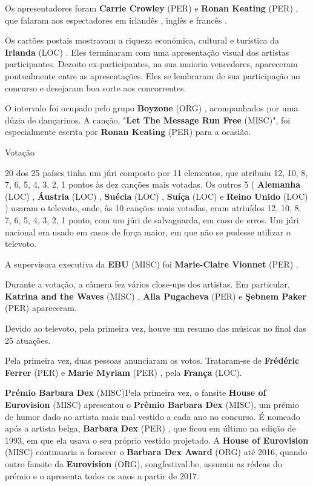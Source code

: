 \documentclass[12pt,a4paper]{article}
\begin{document}
Os apresentadores foram \textbf{Carrie Crowley} (PER) e \textbf{Ronan Keating} (PER) , que falaram aos espectadores em irlandês , inglês e francês .

Os cartões postais mostravam a riqueza económica, cultural e turística da \textbf{Irlanda} (LOC) . Eles terminaram com uma apresentação visual dos artistas participantes. Dezoito ex-participantes, na sua maioria vencedores, apareceram pontualmente entre as apresentações. Eles se lembraram de sua participação no concurso e desejaram boa sorte aos concorrentes.

O intervalo foi ocupado pelo grupo \textbf{Boyzone} (ORG) , acompanhados por uma dúzia de dançarinos. A canção, "\textbf{Let The Message Run Free} (MISC)", foi especialmente escrita por \textbf{Ronan Keating} (PER) para a ocasião.



Votação

20 dos 25 países tinha um júri composto por 11 elementos, que atribuiu 12, 10, 8, 7, 6, 5, 4, 3, 2, 1 pontos às dez canções mais votadas. Os outros 5 ( \textbf{Alemanha} (LOC) , \textbf{Áustria} (LOC) , \textbf{Suécia} (LOC) , \textbf{Suíça} (LOC) e \textbf{Reino Unido} (LOC) ) usaram o televoto, onde, às 10 canções mais votadas, eram atriuídos 12, 10, 8, 7, 6, 5, 4, 3, 2, 1 ponto, com um júri de salvaguarda, em caso de erros. Um júri nacional era usado em casos de força maior, em que não se pudesse utilizar o televoto.

A supervisora executiva da \textbf{EBU} (MISC) foi \textbf{Marie-Claire Vionnet} (PER) .

Durante a votação, a câmera fez vários close-ups dos artistas. Em particular, \textbf{Katrina and the Waves} (MISC) , \textbf{Alla Pugacheva} (PER) e \textbf{Şebnem Paker} (PER) apareceram.

Devido ao televoto, pela primeira vez, houve um resumo das músicas no final das 25 atuações.

Pela primeira vez, duas pessoas anunciaram os votos. Trataram-se de \textbf{Frédéric Ferrer} (PER) e \textbf{Marie Myriam} (PER) , pela \textbf{França} (LOC).



\textbf{Prémio Barbara Dex} (MISC)Pela primeira vez, o fansite \textbf{House of Eurovision} (MISC) apresentou o \textbf{Prêmio Barbara Dex} (MISC), um prémio de humor dado ao artista mais mal vestido a cada ano no concurso. É nomeado após a artista belga, \textbf{Barbara Dex} (PER) , que ficou em último na edição de 1993, em que ela usava o seu próprio vestido projetado. A \textbf{House of Eurovision} (MISC) continuaria a fornecer o \textbf{Barbara Dex Award} (ORG) até 2016, quando outro fansite da \textbf{Eurovision} (ORG), songfestival.be, assumiu as rédeas do prémio e o apresenta todos os anos a partir de 2017.
\end{document}
